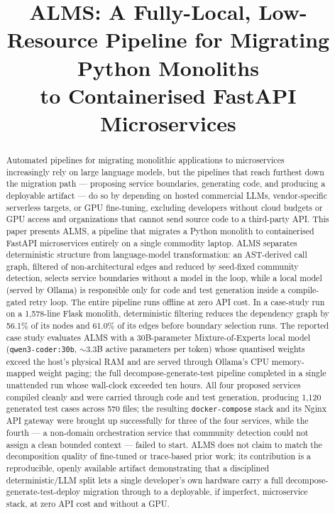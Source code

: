 \documentclass[conference]{IEEEtran}
\begin{document}
\title{ALMS: A Fully-Local, Low-Resource Pipeline for Migrating Python Monoliths\\ to Containerised FastAPI Microservices}

\maketitle

\begin{abstract}
Automated pipelines for migrating monolithic applications to microservices increasingly rely on large language models, but the pipelines that reach furthest down the migration path --- proposing service boundaries, generating code, and producing a deployable artifact --- do so by depending on hosted commercial LLMs, vendor-specific serverless targets, or GPU fine-tuning, excluding developers without cloud budgets or GPU access and organizations that cannot send source code to a third-party API. This paper presents ALMS, a pipeline that migrates a Python monolith to containerised FastAPI microservices entirely on a single commodity laptop. ALMS separates deterministic structure from language-model transformation: an AST-derived call graph, filtered of non-architectural edges and reduced by seed-fixed community detection, selects service boundaries without a model in the loop, while a local model (served by Ollama) is responsible only for code and test generation inside a compile-gated retry loop. The entire pipeline runs offline at zero API cost. In a case-study run on a 1,578-line Flask monolith, deterministic filtering reduces the dependency graph by 56.1\% of its nodes and 61.0\% of its edges before boundary selection runs. The reported case study evaluates ALMS with a 30B-parameter Mixture-of-Experts local model (\texttt{qwen3-coder:30b}, $\sim$3.3B active parameters per token) whose quantised weights exceed the host's physical RAM and are served through Ollama's CPU memory-mapped weight paging; the full decompose-generate-test pipeline completed in a single unattended run whose wall-clock exceeded ten hours. All four proposed services compiled cleanly and were carried through code and test generation, producing 1,120 generated test cases across 570 files; the resulting \texttt{docker-compose} stack and its Nginx API gateway were brought up successfully for three of the four services, while the fourth --- a non-domain orchestration service that community detection could not assign a clean bounded context --- failed to start. ALMS does not claim to match the decomposition quality of fine-tuned or trace-based prior work; its contribution is a reproducible, openly available artifact demonstrating that a disciplined deterministic/LLM split lets a single developer's own hardware carry a full decompose-generate-test-deploy migration through to a deployable, if imperfect, microservice stack, at zero API cost and without a GPU.
\end{abstract}
\end{document}
